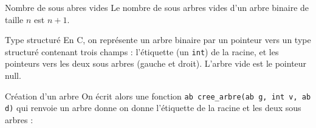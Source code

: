 \documentclass[10pt]{beamer}
\begin{document}
\begin{frame}[fragile]{\Ctitle}{\stitle}
    \begin{alertblock}{Nombre de sous abres vides}
		Le nombre de sous arbres vides d'un arbre binaire de taille $n$ est $n+1$.
	\end{alertblock}
\end{frame}

\begin{frame}[fragile]{\Ctitle}{\stitle}
    \begin{block}{Type structuré}
        En C, on représente un arbre binaire par un pointeur vers un type structuré contenant trois champs : l'étiquette (un {\tt int}) de la racine, et les pointeurs vers les deux sous arbres (gauche et droit). L'arbre vide est le pointeur {\sc null}.
    \end{block}
\end{frame}

\begin{frame}[fragile]{\Ctitle}{\stitle}
    \begin{block}{Création d'un arbre}
        On écrit alors une fonction \texttt{ab cree_arbre(ab g, int v, ab d)}  qui renvoie un arbre donne on donne l'étiquette de la racine et les deux sous arbres :
    \end{block}
\end{frame}
\end{document}

